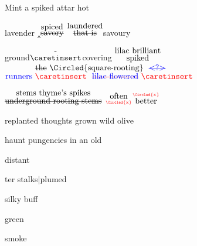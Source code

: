 \documentclass[a4paper]{article}
\begin{document}
\begin{minipage}[t]{0.85\textwidth}
\draft
\vspace{0.1in}
Mint a spiked attar hot\par 
lavender $\caretinsert$$\stackrel{\hbox{spiced}}{\hbox{\st{savory}}}$ $\stackrel{\hbox{laundered}}{\hbox{\st{that is}}}$savoury \raisebox{0.5em}{purpled}\par
{}
ground$\stackrel{\hbox{-}}{\hbox{$\caretinsert$}}$covering \color{red}\Circled{\color{blue}{3}} $\stackrel{\hbox{lilac brilliant}}{\hbox{spiked}}$
$\stackrel{\hbox{\st{the} \Circled{square-rooting} 
\color{blue}
\setstcolor{blue}
\st{<?>}}}
{\hbox{\color{blue}{runners}
\color{red}{$\caretinsert$}
\setstcolor{red}
\color{blue}{\st{lilac flowered}}
\color{red}{$\caretinsert$}
}}$\par
{}
\color{blue} $\stackrel{\hbox{stems thyme's spikes}}{\hbox{\st{underground rooting stems}}}$ $\stackrel{\hbox{often}}{\hbox{\tiny \color{red}\Circled{x}}}$$\stackrel{\hbox{\tiny \color{red}\Circled{x}}}{\hbox{better}}$\par
{}
replanted thoughts grown wild olive\par
haunt pungencies in an old \hfill  \tiny 
\begin{turn}{90}\hspace{0.1in}distant\par\end{turn}
\begin{turn}{90}ter stalks\footnotesize{|}\tiny plumed\par\end{turn}
\begin{turn}{90}\hspace{0.1in}silky buff\par\end{turn}
\begin{turn}{90}\hspace{0.2in}green\par\end{turn}
\begin{turn}{90}\hspace{0.2in}smoke\par\end{turn}\par

\end{minipage}
\end{document}
